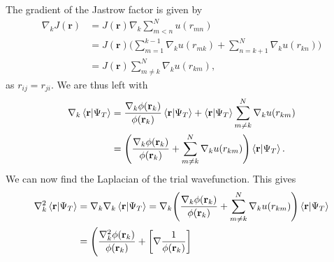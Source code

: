 \documentclass[
    a4paper, aps, twocolumn, floatfix, superscriptaddress]{revtex4-1}
\newcommand{\vf}{\mathbf}
\newcommand{\1}{\mathds{1}}
\begin{document}
            \begin{widetext}
                The gradient of the Jastrow factor is given by
                \begin{align}
                    \nabla_k J(\vf{r})
                    &=
                    J(\vf{r})
                    \nabla_k\sum_{m < n}^N u(r_{mn}) \\
                    &=
                    J(\vf{r})
                    \Biggl(
                        \sum_{m = 1}^{k - 1}
                        \nabla_k u(r_{mk})
                        +
                        \sum_{n = k + 1}^N
                        \nabla_k u(r_{kn})
                    \Biggr) \\
                    &=
                    J(\vf{r})
                    \sum_{m \neq k}^N\nabla_k u(r_{km}),
                \end{align}
                as $r_{ij} = r_{ji}$.  We are thus left with
                \begin{align}
                    \nabla_k\bra{\vf{r}}\ket{\Psi_T}
                    &=
                    \frac{\nabla_k\phi(\vf{r}_k)}{\phi(\vf{r}_k)}
                    \bra{\vf{r}}\ket{\Psi_T}
                    + \bra{\vf{r}}\ket{\Psi_T}
                    \sum_{m \neq k}^N\nabla_k u(r_{km}) \\
                    &=
                    \Biggl(
                        \frac{\nabla_k\phi(\vf{r}_k)}{\phi(\vf{r}_k)}
                        +
                        \sum_{m \neq k}^N\nabla_k u(r_{km})
                    \Biggr)
                    \bra{\vf{r}}\ket{\Psi_T}.
                \end{align}
                We can now find the Laplacian of the trial wavefunction. This
                gives
                \begin{align}
                    \nabla_k^2\bra{\vf{r}}\ket{\Psi_T}
                    &= \nabla_k\nabla_k\bra{\vf{r}}\ket{\Psi_T}
                    = \nabla_k
                    \Biggl(
                        \frac{\nabla_k\phi(\vf{r}_k)}{\phi(\vf{r}_k)}
                        +
                        \sum_{m \neq k}^N\nabla_k u(r_{km})
                    \Biggr)
                    \bra{\vf{r}}\ket{\Psi_T} \\
                    &=
                    \Biggl(
                        \frac{\nabla_k^2\phi(\vf{r}_k)}{\phi(\vf{r}_k)}
                        + \left[
                            \nabla\frac{1}{\phi(\vf{r}_k)}
                        \right]

\end{align}
\end{widetext}
\end{document}
